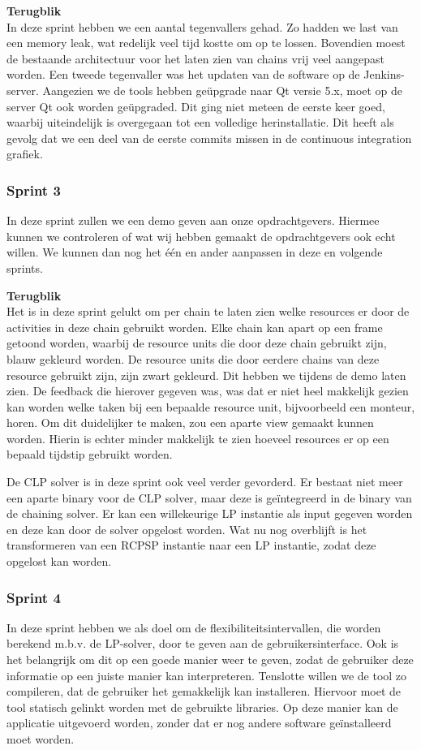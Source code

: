 \textbf{Terugblik} \\
In deze sprint hebben we een aantal tegenvallers gehad. Zo hadden we last van een memory leak, wat redelijk veel tijd kostte om op te lossen. Bovendien moest de bestaande architectuur voor het laten zien van chains vrij veel aangepast worden. Een tweede tegenvaller was het updaten van de software op de Jenkins-server. Aangezien we de tools hebben ge\"upgrade naar Qt versie 5.x, moet op de server Qt ook worden ge\"upgraded. Dit ging niet meteen de eerste keer goed, waarbij uiteindelijk is overgegaan tot een volledige herinstallatie. Dit heeft als gevolg dat we een deel van de eerste commits missen in de continuous integration grafiek.

\subsubsection{Sprint 3}
In deze sprint zullen we een demo geven aan onze opdrachtgevers. Hiermee kunnen we controleren of wat wij hebben gemaakt de opdrachtgevers ook echt willen. We kunnen dan nog het \'e\'en en ander aanpassen in deze en volgende sprints.

\textbf{Terugblik} \\
Het is in deze sprint gelukt om per chain te laten zien welke resources er door de activities in deze chain gebruikt worden. Elke chain kan apart op een frame getoond worden, waarbij de resource units die door deze chain gebruikt zijn, blauw gekleurd worden. De resource units die door eerdere chains van deze resource gebruikt zijn, zijn zwart gekleurd. Dit hebben we tijdens de demo laten zien. De feedback die hierover gegeven was, was dat er niet heel makkelijk gezien kan worden welke taken bij een bepaalde resource unit, bijvoorbeeld een monteur, horen. Om dit duidelijker te maken, zou een aparte view gemaakt kunnen worden. Hierin is echter minder makkelijk te zien hoeveel resources er op een bepaald tijdstip gebruikt worden.

De CLP solver is in deze sprint ook veel verder gevorderd. Er bestaat niet meer een aparte binary voor de CLP solver, maar deze is ge\"integreerd in de binary van de chaining solver. Er kan een willekeurige LP instantie als input gegeven worden en deze kan door de solver opgelost worden. Wat nu nog overblijft is het transformeren van een RCPSP instantie naar een LP instantie, zodat deze opgelost kan worden.

\subsubsection{Sprint 4}
In deze sprint hebben we als doel om de flexibiliteitsintervallen, die worden berekend m.b.v. de LP-solver, door te geven aan de gebruikersinterface. Ook is het belangrijk om dit op een goede manier weer te geven, zodat de gebruiker deze informatie op een juiste manier kan interpreteren. Tenslotte willen we de tool zo compileren, dat de gebruiker het gemakkelijk kan installeren. Hiervoor moet de tool statisch gelinkt worden met de gebruikte libraries. Op deze manier kan de applicatie uitgevoerd worden, zonder dat er nog andere software ge\"installeerd moet worden.

